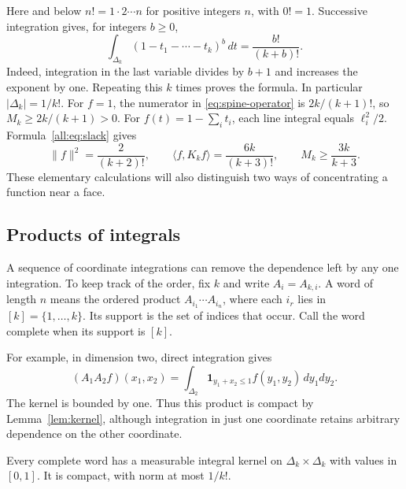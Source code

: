 \documentclass[11pt]{article}
\begin{document}
Here and below $n!=1\cdot2\cdots n$ for positive integers $n$, with
$0!=1$.  Successive integration gives, for integers $b\geq0$,
\begin{equation}\label{all:eq:slack}
 \int_{\Delta_k}(1-t_1-\cdots-t_k)^b\,dt=\frac{b!}{(k+b)!}.
\end{equation}
Indeed, integration in the last variable divides by $b+1$ and increases
the exponent by one.  Repeating this $k$ times proves the formula.
In particular $|\Delta_k|=1/k!$.
For $f=1$, the numerator in \eqref{eq:spine-operator} is $2k/(k+1)!$,
so $M_k\geq2k/(k+1)>0$.
For $f(t)=1-\sum_i t_i$, each line integral equals $\ell_i^2/2$.
Formula~\eqref{all:eq:slack} gives
\begin{equation}\label{all:eq:linear-bound}
 \|f\|^2=\frac2{(k+2)!},\qquad
 \langle f,K_kf\rangle=\frac{6k}{(k+3)!},\qquad
 M_k\geq\frac{3k}{k+3}.
\end{equation}
These elementary calculations will also distinguish two ways of
concentrating a function near a face.

\subsection{Products of integrals}

A sequence of coordinate integrations can remove the dependence left by
any one integration.  To keep track of the order, fix $k$ and write
$A_i=A_{k,i}$.  A word of length $n$ means the ordered product
$A_{i_1}\cdots A_{i_n}$, where each $i_r$ lies in $[k]=\{1,\ldots,k\}$.
Its support is the set of indices that occur.  Call the word complete
when its support is $[k]$.

For example, in dimension two, direct integration gives
\[
 (A_1A_2f)(x_1,x_2)
 =\int_{\Delta_2}\mathbf1_{y_1+x_2\leq1}f(y_1,y_2)\,dy_1dy_2.
\]
The kernel is bounded by one.  Thus this product is compact by
Lemma~\ref{lem:kernel}, although integration in just one coordinate
retains arbitrary dependence on the other coordinate.

\begin{lemma}\label{all:lem:complete-words}
Every complete word has a measurable integral kernel on
$\Delta_k\times\Delta_k$ with values in $[0,1]$.
It is compact, with norm at most $1/k!$.
\end{lemma}
\end{document}
